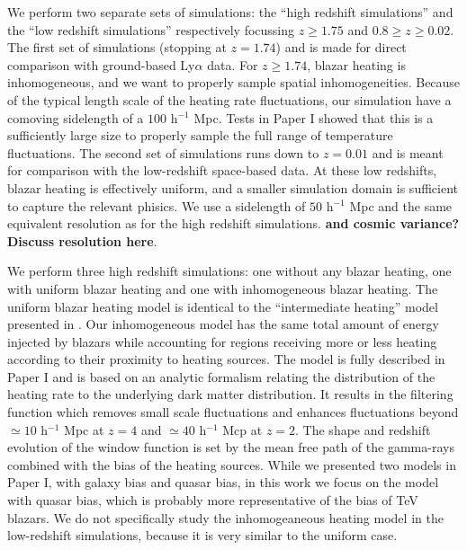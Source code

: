 \documentclass[numberedappendix]{emulateapj}
\newcommand\ALc[1]{{\color{red} \bf #1}} %
\begin{document}

We perform two separate sets of simulations: the ``high redshift simulations'' and the ``low redshift simulations''  respectively focussing $z\geq 1.75$ and $0.8\geq z\geq 0.02$. The first set of simulations (stopping at $z=1.74$) and is made for direct comparison with ground-based Ly$\alpha$ data. For $z\geq 1.74$, blazar heating is inhomogeneous, and we want to properly sample spatial inhomogeneities. Because of the typical length scale of the heating rate fluctuations, our simulation have a comoving sidelength of  a $100$ h$^{-1}$ Mpc.  Tests in Paper I showed that this is a sufficiently large size to properly sample the full range of temperature fluctuations. The second set of simulations runs down to $z=0.01$ and is meant for comparison with the low-redshift space-based data. At these low redshifts, blazar heating is effectively uniform, and  a smaller simulation domain is sufficient to capture the relevant phisics. We use a sidelength of $50$ h$^{-1}$ Mpc and the same equivalent resolution as for the high redshift simulations.
 \ALc{and cosmic variance?}\ALc{Discuss resolution here}. 


We perform three high redshift simulations: one without any blazar heating, one with uniform blazar heating and one with inhomogeneous blazar heating.  The uniform blazar heating model is identical to the ``intermediate heating'' model presented in \citet{2012MNRAS.423..149P}.  Our inhomogeneous model has the same total amount of energy injected by blazars while accounting for regions receiving more or less heating according to their proximity to heating sources. The model is fully described in Paper I  and is based on an analytic formalism relating the distribution of the heating rate to the underlying dark matter distribution. It results in the  filtering function which  removes small scale fluctuations and enhances fluctuations beyond $\simeq 10$ h$^{-1}$ Mpc at $z=4$ and $\simeq 40$ h$^{-1}$ Mcp at $z=2$.  The shape and redshift evolution of the  window function is set by the mean free path of the gamma-rays combined with the bias of the heating sources.  While we presented two models in Paper I, with galaxy bias and quasar bias, in this work we focus on the model with quasar bias, which is probably more representative of the bias of TeV blazars.  We do not specifically study the inhomogeaneous heating model in the low-redshift simulations, because it is very similar to the uniform case.
\end{document}
